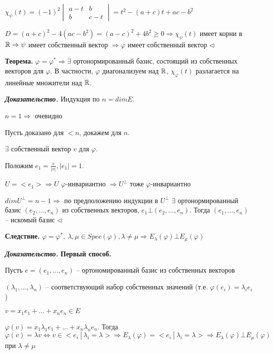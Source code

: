 $\chi_{\psi} (t) = (-1)^2 \begin{vmatrix}
a- t & b \\ b & c - t \end{vmatrix} = t^2 - (a + c) t + ac - b^2$

$D = (a+c)^2 - 4 (ac - b^2) = (a-c)^2 +4b^2 \geq 0 \Rightarrow \chi_{\psi} (t)$ имеет корни в $\mathbb{R} \Rightarrow \psi$ имеет собственный вектор $\Rightarrow \varphi$ имеет собственный вектор $\lhd$

\bigskip
\textbf{Теорема.} $\varphi = \varphi^* \Rightarrow \exists$ ортонормированный базис, состоящий из собственных векторов для $\varphi$. В частности, $\varphi$ диагонализуем над $\mathbb{R}$, $\chi_{\varphi} (t)$ разлагается на линейные множители над $\mathbb{R}$.

\bigskip
\textbf{\textit{Доказательство.}} Индукция по $n = dim E$.

$n = 1 \Rightarrow$ очевидно

Пусть доказано для $<n$, докажем для $n$.

$\exists$ собственный вектор $v$ для $\varphi$.

Положим $e_1 = \frac{v}{|v|}, |e_1| = 1$.

$U = <e_1> \Rightarrow U$ $\varphi$-инвариантно $\Rightarrow U^{\bot}$ тоже $\varphi$-инвариантно

$dim U^{\bot} = n - 1 \Rightarrow$ по предположению индукции в $U^{\bot}$  $\exists$ ортонормированный базис $(e_2, \dots, e_n)$ из собственных векторов, $e_1 \bot (e_2, \dots, e_n)$. Тогда $(e_1, \dots, e_n)$ -- искомый базис $\lhd$

\bigskip
\textbf{Следствие.} $\varphi = \varphi^*, \ \lambda, \mu \in Spec(\varphi), \lambda \neq \mu \Rightarrow E_{\lambda} (\varphi) \bot E_{\mu} (\varphi)$

\bigskip
\textbf{\textit{Доказательство.}} \textbf{Первый способ.}

Пусть $e = (e_1, \dots, e_n)$ -- ортономированный базис из собственных векторов

$(\lambda_1, \dots, \lambda_n)$ -- соответствующий набор собственных значений (т.е. $\varphi (e_i) = \lambda_i e_i$)

$v = x_1 e_1 + \dots + x_n e_n \in E$

$\varphi(v) = x_1 \lambda_1 e_1 + \dots + x_n \lambda_n e_n$. Тогда $\varphi (v) = \lambda v \Leftrightarrow v \in <e_i \ | \ \lambda_i = \lambda> \Rightarrow E_{\lambda} (\varphi) = <e_i \ | \ \lambda_i = \lambda > \Rightarrow E_{\lambda} (\varphi) \bot E_{\mu} (\varphi)$ при $\lambda \neq \mu$

